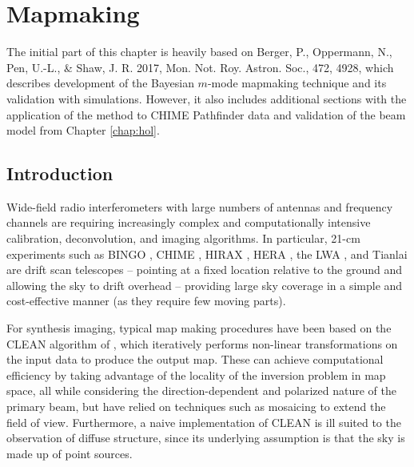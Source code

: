 \chapter{\label{chap:mapmaking} Mapmaking}

The initial part of this chapter is heavily based on 
\newline
\newline
Berger, P., Oppermann, N., Pen, U.-L., \& Shaw, J. R. 2017, Mon. Not. Roy. Astron. Soc., 472, 4928,
\newline
\newline
which describes development of the Bayesian $m$-mode mapmaking technique and its validation with simulations. However, it also includes additional sections with the application of the method to CHIME Pathfinder data and validation of the beam model from Chapter \ref{chap:hol}.

\newpage


\section{Introduction} \label{ch:mm:sec:intro}

Wide-field radio interferometers with large numbers of antennas and frequency channels are requiring increasingly complex and computationally intensive calibration, deconvolution, and imaging algorithms. In particular, 21-cm experiments such as BINGO \citep{bingoupdate},  CHIME \citep{chimepath1}, HIRAX \citep{hirax}, HERA \citep{hera}, the LWA \citep{eastwoodetal}, and Tianlai \citep{tianlai} are drift scan telescopes -- pointing at a fixed location relative to the ground and allowing the sky to drift overhead -- providing large sky coverage in a simple and cost-effective manner (as they require few moving parts).

For synthesis imaging, typical map making procedures have been based on the CLEAN algorithm of \cite{clean}, which iteratively performs non-linear transformations on the input data to produce the output map. These can achieve computational efficiency by taking advantage of the locality of the inversion problem in map space, all while considering the direction-dependent and polarized nature of the primary beam, but have relied on techniques such as mosaicing to extend the field of view. Furthermore, a naive implementation of CLEAN is ill suited to the observation of diffuse structure, since its underlying assumption is that the sky is made up of point sources.

